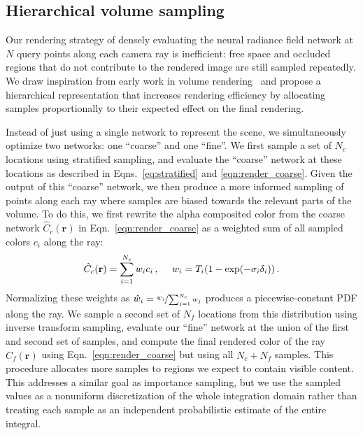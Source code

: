 \documentclass[runningheads]{llncs}
\let\originalleft\left
\let\originalright\right
\renewcommand{\left}{\mathopen{}\mathclose\bgroup\originalleft}
\renewcommand{\right}{\aftergroup\egroup\originalright}
\newcommand{\expo}[1]{\exp\left(#1\right)}
\newcommand{\absrp}{\sigma}
\newcommand{\numsamples}{N}
\newcommand{\numsamplescoarse}{N_c}
\newcommand{\numsamplesfine}{N_f}
\newcommand{\deltatime}{\delta}
\newcommand{\ray}{\mathbf{r}}
\newcommand{\Ccoarse}{\hat{C}_c(\ray)}
\newcommand{\Cfine}{\hat{C}_f(\ray)}
\newcommand{\pweight}{w}
\newcommand{\normpweight}{\hat{w}}
\begin{document}
\subsection{Hierarchical volume sampling}
\label{sec:hierarchical}

Our rendering strategy of densely evaluating the neural radiance field network at $\numsamples$ query points along each camera ray is inefficient: free space and occluded regions that do not contribute to the rendered image are still sampled repeatedly.
We draw inspiration from early work in volume rendering~\cite{levoy90} and propose a hierarchical representation that increases rendering efficiency by allocating samples proportionally to their expected effect on the final rendering.

Instead of just using a single network to represent the scene, we simultaneously optimize two networks: one ``coarse'' and one ``fine''.
We first sample a set of $\numsamplescoarse$ locations using stratified sampling, and evaluate the ``coarse'' network at these locations as described in Eqns.~\ref{eq:stratified} and \ref{eqn:render_coarse}. Given the output of this ``coarse'' network, we then produce a more informed sampling of points along each ray where samples are biased towards the relevant parts of the volume. To do this, we first rewrite the alpha composited color from the coarse network $\Ccoarse$ in Eqn.~\ref{eqn:render_coarse} as a weighted sum of all sampled colors $c_i$ along the ray:
\begin{equation}
  \Ccoarse=\sum_{i=1}^{\numsamplescoarse}\pweight_i c_i\,, \quad\,\,
  \pweight_i = T_i(1-\expo{-\absrp_i \deltatime_i})\,.
  \label{eqn:weights}
\end{equation}
Normalizing these weights as $\normpweight_i = \nicefrac{\pweight_i}{\sum_{j=1}^{\numsamplescoarse} \pweight_j}$ produces a piecewise-constant PDF along the ray.
We sample a second set of $\numsamplesfine$ locations from this distribution using inverse transform sampling, evaluate our ``fine'' network at the union of the first and second set of samples, and compute the final rendered color of the ray $\Cfine$ using Eqn.~\ref{eqn:render_coarse} but using all $\numsamplescoarse+\numsamplesfine$ samples. This procedure allocates more samples to regions we expect to contain visible content. This addresses a similar goal as importance sampling, but we use the sampled values as a nonuniform discretization of the whole integration domain rather than treating each sample as an independent probabilistic estimate of the entire integral.
\end{document}
